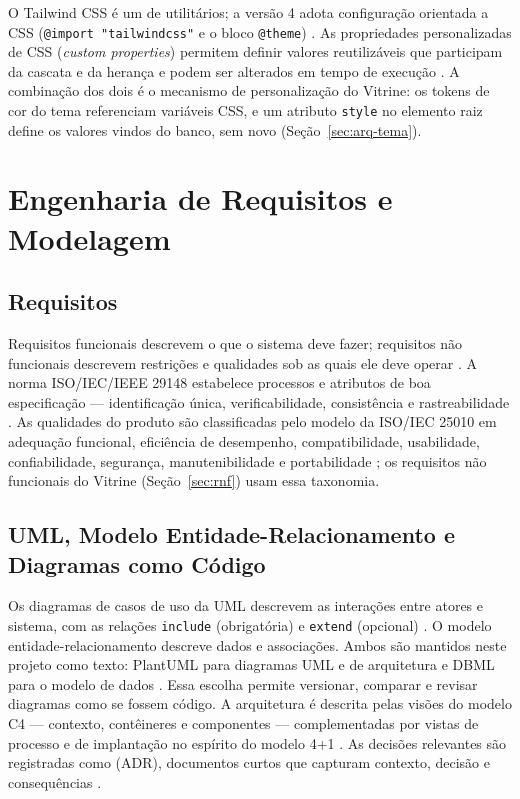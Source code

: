 O Tailwind CSS é um  de utilitários; a versão 4 adota configuração orientada a CSS (\texttt{@import "tailwindcss"} e o bloco \texttt{@theme}) \cite{tailwinddocs}. As propriedades personalizadas de CSS (\emph{custom properties}) permitem definir valores reutilizáveis que participam da cascata e da herança e podem ser alterados em tempo de execução \cite{mdncssvars}. A combinação dos dois é o mecanismo de personalização do Vitrine: os tokens de cor do tema referenciam variáveis CSS, e um atributo \texttt{style} no elemento raiz define os valores vindos do banco, sem novo  (Seção~\ref{sec:arq-tema}).

\section{Engenharia de Requisitos e Modelagem}\label{sec:fund-modelagem}

\subsection{Requisitos}

Requisitos funcionais descrevem o que o sistema deve fazer; requisitos não funcionais descrevem restrições e qualidades sob as quais ele deve operar \cite{sommerville2011,pressman2021}. A norma ISO/IEC/IEEE 29148 estabelece processos e atributos de boa especificação --- identificação única, verificabilidade, consistência e rastreabilidade \cite{iso29148}. As qualidades do produto são classificadas pelo modelo da ISO/IEC 25010 em adequação funcional, eficiência de desempenho, compatibilidade, usabilidade, confiabilidade, segurança, manutenibilidade e portabilidade \cite{iso25010}; os requisitos não funcionais do Vitrine (Seção~\ref{sec:rnf}) usam essa taxonomia.

\subsection{UML, Modelo Entidade-Relacionamento e Diagramas como Código}

Os diagramas de casos de uso da UML descrevem as interações entre atores e sistema, com as relações \texttt{include} (obrigatória) e \texttt{extend} (opcional) \cite{umlspec}. O modelo entidade-relacionamento descreve dados e associações. Ambos são mantidos neste projeto como texto: PlantUML para diagramas UML e de arquitetura \cite{plantumldocs} e DBML para o modelo de dados \cite{dbmldocs}. Essa escolha permite versionar, comparar e revisar diagramas como se fossem código. A arquitetura é descrita pelas visões do modelo C4 --- contexto, contêineres e componentes \cite{c4model} --- complementadas por vistas de processo e de implantação no espírito do modelo 4+1 \cite{kruchten1995}. As decisões relevantes são registradas como  (ADR), documentos curtos que capturam contexto, decisão e consequências \cite{nygard2011adr}.

